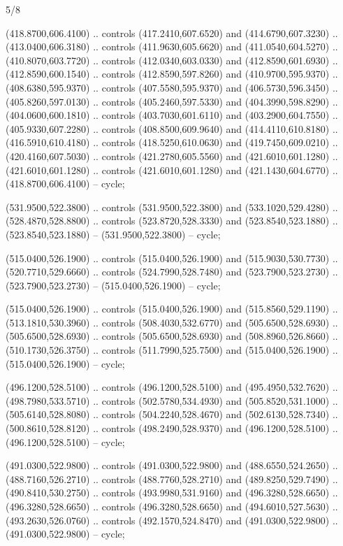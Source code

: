 \begin{flagdescription}{5/8}
\begin{scope}[shift={(m)}]
\begin{scope}[scale=\flagwidth/220,y=0.1mm, x=0.1mm, yscale=-1,shift={(-596,-360)}]
\begin{scope}[draw=black,line join=round,line cap=round,line width=0.381\lw]
\begin{scope}[line width=0.534\lw,fill=green]
 (418.8700,606.4100) .. controls (417.2410,607.6520) and
  (414.6790,607.3230) .. (413.0400,606.3180) .. controls (411.9630,605.6620) and
  (411.0540,604.5270) .. (410.8070,603.7720) .. controls (412.0340,603.0330) and
  (412.8590,601.6930) .. (412.8590,600.1540) .. controls (412.8590,597.8260) and
  (410.9700,595.9370) .. (408.6380,595.9370) .. controls (407.5580,595.9370) and
  (406.5730,596.3450) .. (405.8260,597.0130) .. controls (405.2460,597.5330) and
  (404.3990,598.8290) .. (404.0600,600.1810) .. controls (403.7030,601.6110) and
  (403.2900,604.7550) .. (405.9330,607.2280) .. controls (408.8500,609.9640) and
  (414.4110,610.8180) .. (416.5910,610.4180) .. controls (418.5250,610.0630) and
  (419.7450,609.0210) .. (420.4160,607.5030) .. controls (421.2780,605.5560) and
  (421.6010,601.1280) .. (421.6010,601.1280) .. controls (421.6010,601.1280) and
  (421.1430,604.6770) .. (418.8700,606.4100) -- cycle;

\end{scope}
\begin{scope}[fill=olive]
 (531.9500,522.3800) .. controls (531.9500,522.3800) and
  (533.1020,529.4280) .. (528.4870,528.8800) .. controls (523.8720,528.3330) and
  (523.8540,523.1880) .. (523.8540,523.1880) -- (531.9500,522.3800) -- cycle;

 (515.0400,526.1900) .. controls (515.0400,526.1900) and
  (515.9030,530.7730) .. (520.7710,529.6660) .. controls (524.7990,528.7480) and
  (523.7900,523.2730) .. (523.7900,523.2730) -- (515.0400,526.1900) -- cycle;

 (515.0400,526.1900) .. controls (515.0400,526.1900) and
  (515.8560,529.1190) .. (513.1810,530.3960) .. controls (508.4030,532.6770) and
  (505.6500,528.6930) .. (505.6500,528.6930) .. controls (505.6500,528.6930) and
  (508.8960,526.8660) .. (510.1730,526.3750) .. controls (511.7990,525.7500) and
  (515.0400,526.1900) .. (515.0400,526.1900) -- cycle;

 (496.1200,528.5100) .. controls (496.1200,528.5100) and
  (495.4950,532.7620) .. (498.7980,533.5710) .. controls (502.5780,534.4930) and
  (505.8520,531.1000) .. (505.6140,528.8080) .. controls (504.2240,528.4670) and
  (502.6130,528.7340) .. (500.8610,528.8120) .. controls (498.2490,528.9370) and
  (496.1200,528.5100) .. (496.1200,528.5100) -- cycle;

 (491.0300,522.9800) .. controls (491.0300,522.9800) and
  (488.6550,524.2650) .. (488.7160,526.2710) .. controls (488.7760,528.2710) and
  (489.8250,529.7490) .. (490.8410,530.2750) .. controls (493.9980,531.9160) and
  (496.3280,528.6650) .. (496.3280,528.6650) .. controls (496.3280,528.6650) and
  (494.6010,527.5630) .. (493.2630,526.0760) .. controls (492.1570,524.8470) and
  (491.0300,522.9800) .. (491.0300,522.9800) -- cycle;


\end{scope}
\end{scope}
\end{scope}
\end{scope}
\end{flagdescription}
